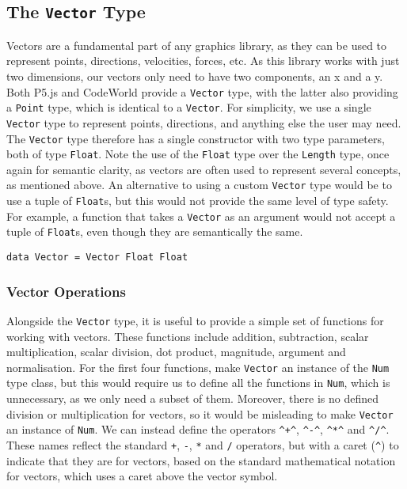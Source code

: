 \documentclass[../main.tex]{subfiles}
\begin{document}
        \subsection{The \texttt{Vector}
            Type} Vectors are a fundamental part of any graphics library, as they can be
                used to represent points, directions, velocities, forces, etc. As this library
                works with just two dimensions, our vectors only need to have two components,
                an x and a y.
            Both P5.js and CodeWorld provide a \texttt{Vector} type, with the latter also
                providing a \texttt{Point} type, which is identical to a \texttt{Vector}.
            For simplicity, we use a single \texttt{Vector} type to represent points,
                directions, and anything else the user may need.
            The \texttt{Vector} type therefore has a single constructor with two type
                parameters, both of type \texttt{Float}.
            Note the use of the \texttt{Float} type over the \texttt{Length} type, once
                again for semantic clarity, as vectors are often used to represent several
                concepts, as mentioned above.
            An alternative to using a custom \texttt{Vector} type would be to use a tuple
                of \texttt{Float}s, but this would not provide the same level of type safety.
            For example, a function that takes a \texttt{Vector} as an argument would not
                accept a tuple of \texttt{Float}s, even though they are semantically the same.

            \begin{lstlisting}[label={lst:vector}, caption={The \texttt{Vector} type definition.}]
data Vector = Vector Float Float\end{lstlisting}

            \subsubsection{Vector Operations}
                Alongside the \texttt{Vector} type, it is useful to provide a simple set of
                    functions for working with vectors.
                These functions include addition, subtraction, scalar multiplication, scalar
                    division, dot product, magnitude, argument and normalisation.
                For the first four functions, make \texttt{Vector} an instance of the
                    \texttt{Num} type class, but this would require us to define all the functions
                    in \texttt{Num}, which is unnecessary, as we only need a subset of them.
                Moreover, there is no defined division or multiplication for vectors, so it
                    would be misleading to make \texttt{Vector} an instance of \texttt{Num}.
                We can instead define the operators \verb|^+^|, \verb|^-^|, \verb|^*^| and
                    \verb|^/^|.
                These names reflect the standard \verb|+|, \verb|-|, \verb|*| and \verb|/|
                    operators, but with a caret (\verb|^|) to indicate that they are for vectors,
                    based on the standard mathematical notation for vectors, which uses a caret
                    above the vector symbol.
\end{document}
